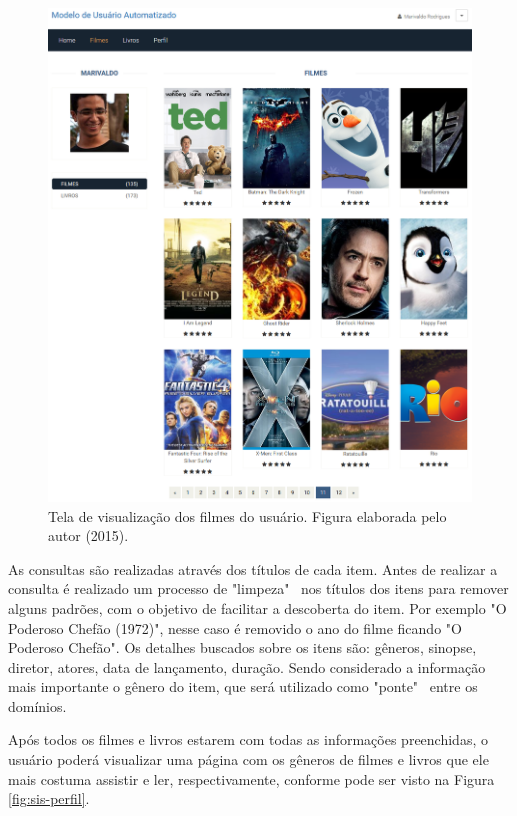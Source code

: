 \begin{figure}
	\centering
	\includegraphics[scale=0.4]{imagens/sistema/usuario-filmes.png}
	\caption{Tela de visualização dos filmes do usuário. Figura elaborada pelo autor (2015).}
	\label{fig:sis-filmes}
\end{figure}

As consultas são realizadas através dos títulos de cada item. Antes de realizar a consulta é realizado um processo de "limpeza"~ nos títulos dos itens para remover alguns padrões, com o objetivo de facilitar a descoberta do item. Por exemplo "O Poderoso Chefão (1972)", nesse caso é removido o ano do filme ficando "O Poderoso Chefão". Os detalhes buscados sobre os itens são: gêneros, sinopse, diretor, atores, data de lançamento, duração. Sendo considerado a informação mais importante o gênero do item, que será utilizado como "ponte"~ entre os domínios.

Após todos os filmes e livros estarem com todas as informações preenchidas, o usuário poderá visualizar uma página com os gêneros de filmes e livros que ele mais costuma assistir e ler, respectivamente, conforme pode ser visto na Figura \ref{fig:sis-perfil}.

